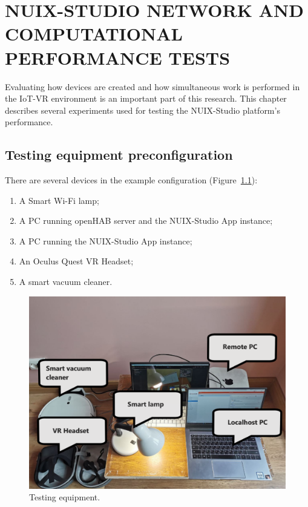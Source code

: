 
\chapter{\MakeUppercase{NUIX-Studio network and computational performance tests}}

Evaluating how devices are created and how simultaneous work is performed in the IoT-VR environment is an important part of this research. This chapter describes several experiments used for testing the NUIX-Studio platform's performance.

\section{Testing equipment preconfiguration}

There are several devices in the example configuration (Figure~\ref{fig:TestingEquipment-figure}):
\begin{enumerate}
    \item A Smart Wi-Fi lamp;
    \item A PC running openHAB server and the NUIX-Studio App instance;
    \item A PC running the NUIX-Studio App instance;
    \item An Oculus Quest VR Headset;
    \item A smart vacuum cleaner.
\end{enumerate}

\begin{figure}
  \centering
  \includegraphics[width = 0.9 \linewidth]{figures/TestingEquipment.png}
  \caption{Testing equipment.}
  \label{fig:TestingEquipment-figure}
\end{figure}

